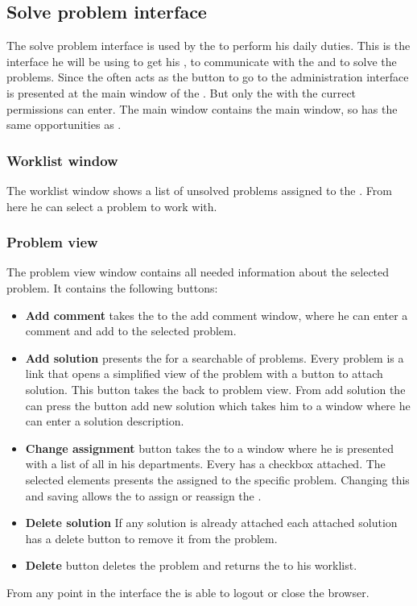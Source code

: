 \newcommand{\spinterface}[1]{\caseControl{s}{olve admin interface}{#1}{}}
\subsection{Solve problem interface}
The solve problem interface is used by the \astaff[] to perform his daily duties. This is the interface he will be using to get his \todolist{}, to communicate with the \aclient{} and to solve the problems. Since the \astaff{} often acts as \sadmin{} the button to go to the administration interface is presented at the main window of the \spinterface{}. But only the \astaff{} with the currect permissions can enter. The main window contains the \client{} main window, so \astaff{} has the same opportunities as \aclient{}.


\subsubsection{Worklist window}
The worklist window shows a list of unsolved problems assigned to the \astaff. From here he can select a problem to work with. 

\subsubsection{Problem view}
The problem view window contains all needed information about the selected problem. It contains the following buttons: 
\begin{itemize}
\item \textbf{Add comment}  takes the \astaff{} to the add comment window, where he can enter a comment and add to the selected problem. 

\item \textbf{Add solution} presents the \astaff{} for a searchable of problems. Every problem is a link that opens a simplified view of the problem with a button to attach solution. This button takes the \astaff{} back to problem view. From add solution the \astaff{} can press the button add new solution which takes him to a window where he can enter a solution description. 

\item \textbf{Change assignment} button takes the \astaff{} to a window where he is presented with a list of all \staff{} in his departments. Every \staff{} has a checkbox attached. The selected elements presents the \staff{} assigned to the specific problem. Changing this and saving allows the \astaff{} to assign or reassign the \astaff{}. 

\item \textbf{Delete solution} If any solution is already attached each attached solution has a delete button to remove it from the problem. 

\item \textbf{Delete} button deletes the problem and returns the \staff{} to his worklist.

\end{itemize}
From any point in the interface the \astaff{} is able to logout or close the browser. 








